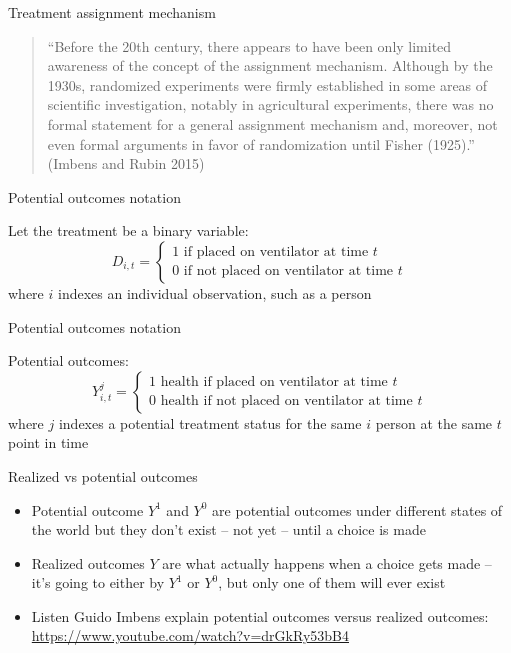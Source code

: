 \documentclass{beamer}
\begin{document}
\begin{frame}{Treatment assignment mechanism}

\begin{quote}

``Before the 20th century, there appears to have been only limited awareness of the concept of the assignment mechanism.  Although by the 1930s, randomized experiments were firmly established in some areas of scientific investigation, notably in agricultural experiments, there was no formal statement for a general assignment mechanism and, moreover, not even formal arguments in favor of randomization until Fisher (1925).'' (Imbens and Rubin 2015)

\end{quote}

\end{frame}




\begin{frame}{Potential outcomes notation}

Let the treatment be a binary variable: $$D_{i,t} =\begin{cases} 1 \text{ if placed on ventilator at time $t$} \\ 0 \text{ if not placed on ventilator at time $t$} \end{cases}$$where $i$ indexes an individual observation, such as a person
\end{frame}

\begin{frame}{Potential outcomes notation}

Potential outcomes: $$Y_{i,t}^j =\begin{cases} 1 \text{ health if placed on ventilator at time $t$} \\ 0 \text{ health if not placed on ventilator at time $t$} \end{cases}$$where $j$ indexes a potential treatment status for the same $i$ person at the same $t$ point in time
\end{frame}


\begin{frame}{Realized vs potential outcomes}

  \begin{itemize}
    \item Potential outcome $Y^1$ and $Y^0$ are potential outcomes under different states of the world but they don't exist -- not yet -- until a choice is made
    \item Realized outcomes $Y$ are what actually happens when a choice gets made -- it's going to either by $Y^1$ or $Y^0$, but only one of them will ever exist
    \item Listen Guido Imbens explain potential outcomes versus realized outcomes:   \url{https://www.youtube.com/watch?v=drGkRy53bB4}

  \end{itemize}
  

\end{frame}
\end{document}

